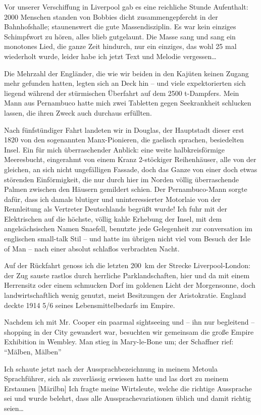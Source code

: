 Vor unserer Verschiffung in Liverpool gab es eine reichliche Stunde Aufenthalt: \num{2000} Menschen standen von Bobbies dicht zusammengepfercht in der Bahnhofshalle; staunenswert die gute Massendisziplin. Es war kein einziges Schimpfwort zu hören, alles blieb gutgelaunt. Die Masse sang und sang ein monotones Lied, die ganze Zeit hindurch, nur ein einziges, das wohl 25 mal wiederholt wurde, leider habe ich jetzt Text und Melodie vergessen\dots

Die Mehrzahl der Engländer, die wie wir beiden in den Kajüten keinen Zugang mehr gefunden hatten, legten sich an Deck hin -- und viele expektorierten sich liegend während der stürmischen Überfahrt auf dem 2500 t-Dampfers. Mein Mann aus Pernambuco hatte mich zwei Tabletten gegen Seekrankheit schlucken lassen, die ihren Zweck auch durchaus erfüllten.

Nach fünfstündiger Fahrt landeten wir in Douglas, der Hauptstadt dieser erst 1820 von den sogenannten Manx-Pionieren, die gaelisch sprachen, besiedelten Insel. Ein für mich überraschender Anblick: eine weite halbkreisförmige Meeresbucht, eingerahmt von einem Kranz 2-stöckiger Reihenhäuser, alle von der gleichen, an sich nicht ungefälligen Fassade, doch das Ganze von einer doch etwas störenden Einförmigkeit, die nur durch hier im Norden völlig überraschende Palmen zwischen den Häusern gemildert schien. Der Pernambuco-Mann sorgte dafür, dass ich damals blutiger und uninteressierter Motorlaie von der Rennleitung als Vertreter Deutschlands begrüßt wurde! Ich fuhr mit der Elektrischen auf die höchste, völlig kahle Erhebung der Insel, mit dem angelsächsischen Namen Snaefell, benutzte jede Gelegenheit zur conversation im englischen small-talk Stil -- und hatte im übrigen nicht viel vom Besuch der Isle of Man -- nach einer absolut schlaflos verbrachten Nacht.

Auf der Rückfahrt genoss ich die letzten 200~km der Strecke Liverpool-London: der Zug sauste rastlos durch herrliche Parklandschaften, hier und da mit einem Herrensitz oder einem schmucken Dorf im goldenen Licht der Morgensonne, doch landwirtschaftlich wenig genutzt, meist Besitzungen der Aristokratie. England deckte 1914 5/6 seines Lebensmittelbedarfs im Empire.

Nachdem ich mit Mr. Cooper ein paarmal sightseeing und -- ihn nur begleitend -- shopping in der City gewandert war, besuchten wir gemeinsam die große Empire Exhibition in Wembley. Man stieg in Mary-le-Bone um; der Schaffner rief: \enquote{Mälben, Mälben}

Ich schaute jetzt nach der Aussprachbezeichnung in meinem Metoula Sprachführer, sich als zuverlässig erwiesen hatte und las dort zu meinem Erstaunen [Märilbn] Ich fragte meine Wirtsleute, welche die richtige Aussprache sei und wurde belehrt, dass alle Aussprachevariationen üblich und damit richtig seien\dots

